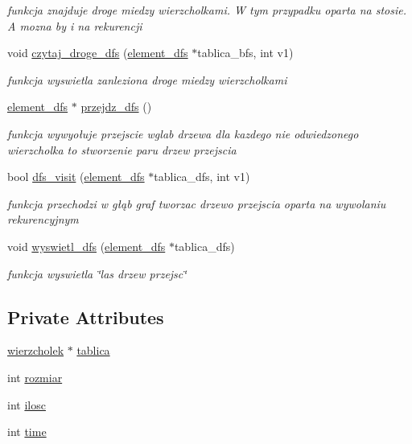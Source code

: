 \begin{DoxyCompactItemize}
\begin{DoxyCompactList}\small\item\em funkcja znajduje droge miedzy wierzcholkami. \-W tym przypadku oparta na stosie. \-A mozna by i na rekurencji \end{DoxyCompactList}\item 
void \hyperlink{classgraf_ac5e916e9b4f36cd6949ee8132e044e9c}{czytaj\-\_\-droge\-\_\-dfs} (\hyperlink{structelement__dfs}{element\-\_\-dfs} $\ast$tablica\-\_\-bfs, int v1)
\begin{DoxyCompactList}\small\item\em funkcja wyswietla zanleziona droge miedzy wierzcholkami \end{DoxyCompactList}\item 
\hyperlink{structelement__dfs}{element\-\_\-dfs} $\ast$ \hyperlink{classgraf_a1a4c08e7c698459b7ceb172fd687dc78}{przejdz\-\_\-dfs} ()
\begin{DoxyCompactList}\small\item\em funkcja wywyołuje przejscie wglab drzewa dla kazdego nie odwiedzonego wierzcholka  to stworzenie paru drzew przejscia \end{DoxyCompactList}\item 
bool \hyperlink{classgraf_a16090538c8c5c1414f3eb45d754ec2cc}{dfs\-\_\-visit} (\hyperlink{structelement__dfs}{element\-\_\-dfs} $\ast$tablica\-\_\-dfs, int v1)
\begin{DoxyCompactList}\small\item\em funkcja przechodzi w głąb graf tworzac drzewo przejscia oparta na wywolaniu rekurencyjnym \end{DoxyCompactList}\item 
void \hyperlink{classgraf_a5b26730ff96f99be35adef3c706a1d72}{wyswietl\-\_\-dfs} (\hyperlink{structelement__dfs}{element\-\_\-dfs} $\ast$tablica\-\_\-dfs)
\begin{DoxyCompactList}\small\item\em funkcja wyswietla \char`\"{}las drzew przejsc\char`\"{} \end{DoxyCompactList}\end{DoxyCompactItemize}
\subsection*{\-Private \-Attributes}
\begin{DoxyCompactItemize}
\item 
\hyperlink{classwierzcholek}{wierzcholek} $\ast$ \hyperlink{classgraf_a028d547c797438718da6241a28b32db5}{tablica}
\item 
int \hyperlink{classgraf_a596da8a77b680d7ec408b1253c2c43c3}{rozmiar}
\item 
int \hyperlink{classgraf_ad9204c0bbc75a2bef4a43200672f9694}{ilosc}
\item 
int \hyperlink{classgraf_a9202cb6ab351f5bbdbb79de440ab1fb5}{time}
\end{DoxyCompactItemize}
